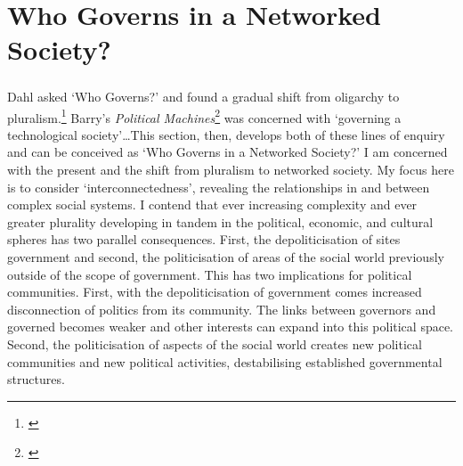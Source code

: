 \newpage
\chapter{Who Governs in a Networked Society?}
\paragraph{}Dahl asked `Who Governs?' and found a gradual shift from oligarchy to pluralism.\footnote{\cite{Dahl:1961fj}} Barry's \emph{Political Machines}\footnote{\cite{Barry:2001ff}} was concerned with `governing a technological society'\ldots This section, then, develops both of these lines of enquiry and can be conceived as `Who Governs in a Networked Society?' I am concerned with the present and the shift from pluralism to networked society. My focus here is to consider `interconnectedness', revealing the relationships in and between complex social systems. I contend that ever increasing complexity and ever greater plurality developing in tandem in the political, economic, and cultural spheres has two parallel consequences. First, the depoliticisation of sites government and second, the politicisation of areas of the social world previously outside of the scope of government. This has two implications for political communities. First, with the depoliticisation of government comes increased disconnection of politics from its community. The links between governors and governed becomes weaker and other interests can expand into this political space. Second, the politicisation of aspects of the social world creates new political communities and new political activities, destabilising established governmental structures.

